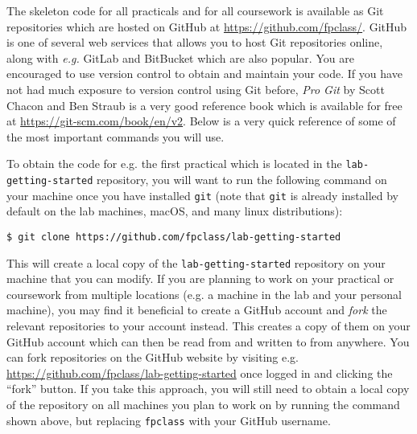 The skeleton code for all practicals and for all coursework is available as Git repositories which are hosted on GitHub at {\small \url{https://github.com/fpclass/}}. GitHub is one of several web services that allows you to host Git repositories online, along with \emph{e.g.} GitLab and BitBucket which are also popular. You are encouraged to use version control to obtain and maintain your code. If you have not had much exposure to version control using Git before, \emph{Pro Git} by Scott Chacon and Ben Straub is a very good reference book which is available for free at {\small \url{https://git-scm.com/book/en/v2}}. Below is a very quick reference of some of the most important commands you will use.

To obtain the code for e.g. the first practical which is located in the \texttt{\small lab-getting-started} repository, you will want to run the following command on your machine once you have installed \texttt{\small git} (note that \texttt{\small git} is already installed by default on the lab machines, macOS, and many linux distributions):
\begin{verbatim}
$ git clone https://github.com/fpclass/lab-getting-started
\end{verbatim}
This will create a local copy of the \texttt{\small lab-getting-started} repository on your machine that you can modify. If you are planning to work on your practical or coursework from multiple locations (e.g. a machine in the lab and your personal machine), you may find it beneficial to create a GitHub account and \emph{fork} the relevant repositories to your account instead. This creates a copy of them on your GitHub account which can then be read from and written to from anywhere. You can fork repositories on the GitHub website by visiting e.g. {\small \url{https://github.com/fpclass/lab-getting-started}} once logged in and clicking the ``fork'' button. If you take this approach, you will still need to obtain a local copy of the repository on all machines you plan to work on by running the command shown above, but replacing \texttt{\small fpclass} with your GitHub username. 


